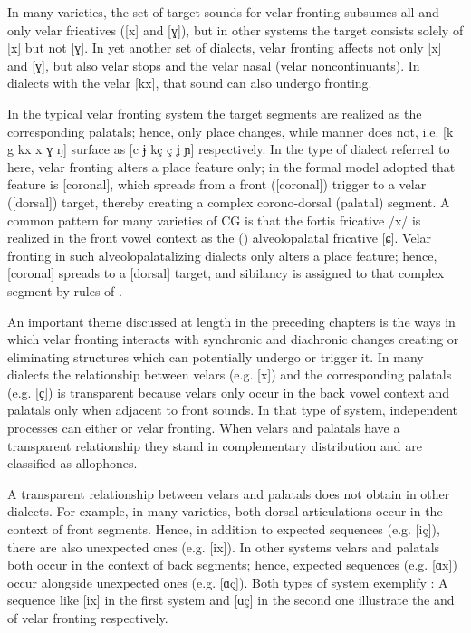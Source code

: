 In many varieties, the set of target sounds for velar fronting subsumes all and only velar fricatives ([x] and [ɣ]), but in other systems the target consists solely of [x] but not [ɣ]. In yet another set of dialects, velar fronting affects not only [x] and [ɣ], but also velar stops and the velar nasal (velar noncontinuants). In dialects with the velar  [kx], that sound can also undergo fronting.

In the typical velar fronting system the target segments are realized as the corresponding palatals; hence, only place changes, while manner does not, i.e. [k g kx x ɣ ŋ] surface as [c ɉ kç ç ʝ ɲ] respectively. In the type of dialect referred to here, velar fronting alters a place feature only; in the formal model adopted that feature is [coronal], which spreads from a front ([coronal]) trigger to a velar ([dorsal]) target, thereby creating a complex corono-dorsal (palatal) segment. A common pattern for many varieties of CG is that the fortis fricative /x/ is realized in the front vowel context as the () alveolopalatal fricative [ɕ]. Velar fronting in such alveolopalatalizing dialects only alters a place feature; hence, [coronal] spreads to a [dorsal] target, and sibilancy is assigned to that complex segment by rules of .

An important theme discussed at length in the preceding chapters is the ways in which velar fronting interacts with synchronic and diachronic changes creating or eliminating structures which can potentially undergo or trigger it. In many dialects the relationship between velars (e.g. [x]) and the corresponding palatals (e.g. [{ҫ}]) is transparent because velars only occur in the back vowel context and palatals only when adjacent to front sounds. In that type of system, independent processes can either  or  velar fronting. When velars and palatals have a transparent relationship they stand in complementary distribution and are classified as allophones.

A transparent relationship between velars and palatals does not obtain in other dialects. For example, in many varieties, both dorsal articulations occur in the context of front segments. Hence, in addition to expected sequences (e.g. [iç]), there are also unexpected ones (e.g. [ix]). In other systems velars and palatals both occur in the context of back segments; hence, expected sequences (e.g. [ɑx]) occur alongside unexpected ones (e.g. [ɑç]). Both types of system exemplify : A sequence like [ix] in the first system and [ɑç] in the second one illustrate the  and  of velar fronting respectively.

